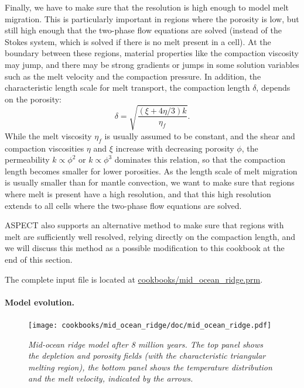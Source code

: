 \documentclass{article}
\newcommand{\aspect}{\textsc{ASPECT}}
\begin{document}
Finally, we have to make sure that the resolution is high enough to model melt migration.
This is particularly important in regions where the porosity is low, but still high enough that
the two-phase flow equations are solved (instead of the Stokes system, which is solved if there is
no melt present in a cell). At the boundary between these regions, material properties like the
compaction viscosity may jump, and there may be strong gradients or jumps in some solution variables such
as the melt velocity and the compaction pressure. In addition, the characteristic length scale for melt transport,
the compaction length $\delta$, depends on the porosity:
\begin{equation}
\delta = \sqrt{\frac{(\xi+4\eta/3)k}{\eta_f}}.
\end{equation}
While the melt viscosity $\eta_f$ is usually assumed to be constant, and the shear and compaction
viscosities $\eta$ and  $\xi$ increase with decreasing porosity $\phi$, the permeability
$k \propto \phi^2$ or $k \propto \phi^3$ dominates this relation, so that the compaction length becomes
smaller for lower porosities.
As the length scale of melt migration is usually smaller than for mantle convection, we want to make
sure that regions where melt is present have a high resolution, and that this high resolution extends
to all cells where the two-phase flow equations are solved.



\aspect{} also supports an alternative method to make sure that regions with melt are sufficiently
well resolved, relying directly on the compaction length, and we will discuss this method as a possible
modification to this cookbook at the end of this section.

The complete input file is located at \url{cookbooks/mid_ocean_ridge.prm}.

\paragraph{Model evolution.}

\begin{figure}
    \centering
    \texttt{[image: cookbooks/mid\_ocean\_ridge/doc/mid\_ocean\_ridge.pdf]}
    \caption{\it Mid-ocean ridge model after 8 million years. The top panel shows the depletion
             and porosity fields (with the characteristic triangular melting region),
             the bottom panel shows the temperature distribution and the melt velocity, indicated
             by the arrows.}
    \label{fig:mid-ocean-ridge}
\end{figure}
\end{document}
